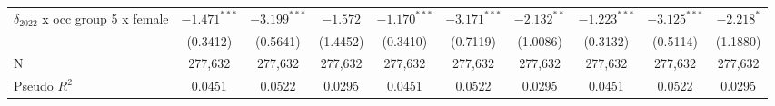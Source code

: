 \begin{tabular}{l|ccc|ccc|ccc|}
$\delta_{2022}$ x occ group 5 x female &          $-1.471^{***}$ &  $-3.199^{***}$ &        $-1.572$ &           $-1.170^{***}$ &  $-3.171^{***}$ &   $-2.132^{**}$ &           $-1.223^{***}$ &  $-3.125^{***}$ &      $-2.218^*$ \\
                                       &                (0.3412) &        (0.5641) &        (1.4452) &                 (0.3410) &        (0.7119) &        (1.0086) &                 (0.3132) &        (0.5114) &        (1.1880) \\
N                                      &                 277,632 &         277,632 &         277,632 &                  277,632 &         277,632 &         277,632 &                  277,632 &         277,632 &         277,632 \\
Pseudo $R^2$                           &                  0.0451 &          0.0522 &          0.0295 &                   0.0451 &          0.0522 &          0.0295 &                   0.0451 &          0.0522 &          0.0295 \\
\bottomrule
\end{tabular}
